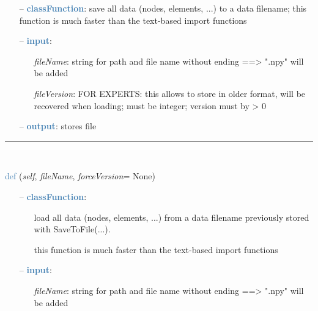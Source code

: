 \begin{itemize}[leftmargin=1.4cm]
\begin{itemize}[leftmargin=1.4cm]
\begin{itemize}[leftmargin=1.4cm]
\begin{itemize}[leftmargin=0.5cm]
\begin{itemize}[leftmargin=1.4cm]
\begin{itemize}[leftmargin=1.4cm]
\begin{itemize}[leftmargin=0.5cm]
\setlength{\itemindent}{0.7cm}
\begin{itemize}[leftmargin=0.7cm]
\item[--]\textcolor{steelblue}{\bf classFunction}: save all data (nodes, elements, ...) to a data filename; this function is much faster than the text-based import functions
\item[--]\textcolor{steelblue}{\bf input}: \vspace{-6pt}
\begin{itemize}[leftmargin=1.2cm]
\setlength{\itemindent}{-0.7cm}
\item[]{\it fileName}: string for path and file name without ending ==> ".npy" will be added
\item[]{\it fileVersion}: FOR EXPERTS: this allows to store in older format, will be recovered when loading; must be integer; version must by > 0
\end{itemize}
\item[--]\textcolor{steelblue}{\bf output}: stores file
\vspace{12pt}\end{itemize}
%
\noindent\rule{8cm}{0.75pt}\vspace{1pt} \\ 
\begin{flushleft}
\noindent \textcolor{steelblue}{def {\bf {}}}\label{sec:FEM:FEMinterface:LoadFromFile}
({\it self}, {\it fileName}, {\it forceVersion}= None)
\end{flushleft}
\setlength{\itemindent}{0.7cm}
\begin{itemize}[leftmargin=0.7cm]
\item[--]\textcolor{steelblue}{\bf classFunction}: \vspace{-6pt}
\begin{itemize}[leftmargin=1.2cm]
\setlength{\itemindent}{-0.7cm}
\item[]load all data (nodes, elements, ...) from a data filename previously stored with SaveToFile(...).
\item[]this function is much faster than the text-based import functions
\end{itemize}
\item[--]\textcolor{steelblue}{\bf input}: \vspace{-6pt}
\begin{itemize}[leftmargin=1.2cm]
\setlength{\itemindent}{-0.7cm}
\item[]{\it fileName}: string for path and file name without ending ==> ".npy" will be added

\end{itemize}
\end{itemize}
\end{itemize}
\end{itemize}
\end{itemize}
\end{itemize}
\end{itemize}
\end{itemize}
\end{itemize}
